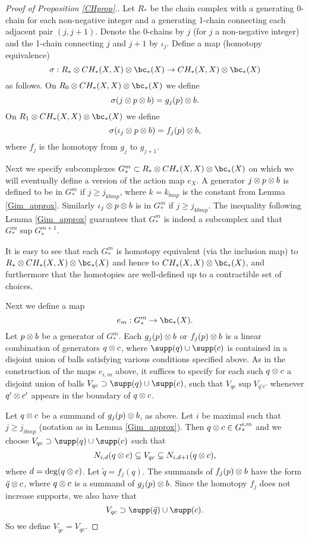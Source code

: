 \begin{proof}[Proof of Proposition \ref{CHprop}.]
\medskip

Let $R_*$ be the chain complex with a generating 0-chain for each non-negative
integer and a generating 1-chain connecting each adjacent pair $(j, j+1)$.
Denote the 0-chains by $j$ (for $j$ a non-negative integer) and the 1-chain connecting $j$ and $j+1$
by $\iota_j$.
Define a map (homotopy equivalence)
\[
	\sigma: R_*\ot CH_*(X, X) \otimes \bc_*(X) \to CH_*(X, X)\ot \bc_*(X)
\]
as follows.
On $R_0\ot CH_*(X, X) \otimes \bc_*(X)$ we define
\[
	\sigma(j\otimes p\otimes b) = g_j(p)\otimes b .
\]
On $R_1\ot CH_*(X, X) \otimes \bc_*(X)$ we define
\[
	\sigma(\iota_j\otimes p\otimes b) = f_j(p)\otimes b ,
\]
where $f_j$ is the homotopy from $g_j$ to $g_{j+1}$.

Next we specify subcomplexes $G^m_* \sub R_*\ot CH_*(X, X) \otimes \bc_*(X)$ on which we will eventually
define a version of the action map $e_X$.
A generator $j\otimes p\otimes b$ is defined to be in $G^m_*$ if $j\ge j_{kbmp}$, where
$k = k_{bmp}$ is the constant from Lemma \ref{Gim_approx}.
Similarly $\iota_j\otimes p\otimes b$ is in $G^m_*$ if $j\ge j_{kbmp}$.
The inequality following Lemma \ref{Gim_approx} guarantees that $G^m_*$ is indeed a subcomplex
and that $G^m_* \sup G^{m+1}_*$.

It is easy to see that each $G^m_*$ is homotopy equivalent (via the inclusion map) 
to $R_*\ot CH_*(X, X) \otimes \bc_*(X)$
and hence to $CH_*(X, X) \otimes \bc_*(X)$, and furthermore that the homotopies are well-defined
up to a contractible set of choices.

Next we define a map
\[
	e_m : G^m_* \to \bc_*(X) .
\]
Let $p\otimes b$ be a generator of $G^m_*$.
Each $g_j(p)\otimes b$ or $f_j(p)\otimes b$ is a linear combination of generators $q\otimes c$,
where $\supp(q)\cup\supp(c)$ is contained in a disjoint union of balls satisfying 
various conditions specified above.
As in the construction of the maps $e_{i,m}$ above,
it suffices to specify for each such $q\otimes c$ a disjoint union of balls
$V_{qc} \sup \supp(q)\cup\supp(c)$, such that $V_{qc} \sup V_{q'c'}$
whenever $q'\otimes c'$ appears in the boundary of $q\otimes c$.

Let $q\otimes c$ be a summand of $g_j(p)\otimes b$, as above.
Let $i$ be maximal such that $j\ge j_{ibmp}$
(notation as in Lemma \ref{Gim_approx}).
Then $q\otimes c \in G^{i,m}_*$ and we choose $V_{qc} \sup \supp(q)\cup\supp(c)$
such that 
\[
	N_{i,d}(q\otimes c) \subseteq V_{qc} \subseteq N_{i,d+1}(q\otimes c) ,
\]
where $d = \deg(q\otimes c)$.
Let $\tilde q = f_j(q)$.
The summands of $f_j(p)\otimes b$ have the form $\tilde q \otimes c$, 
where $q\otimes c$ is a summand of $g_j(p)\otimes b$.
Since the homotopy $f_j$ does not increase supports, we also have that
\[
	V_{qc} \sup \supp(\tilde q) \cup \supp(c) .
\]
So we define $V_{\tilde qc} = V_{qc}$.


\end{proof}
